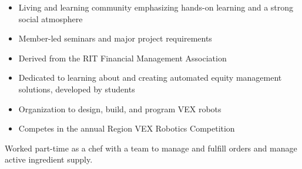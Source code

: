\documentclass[10pt,a4paper,ragged2e,withhyper]{altacv}
\begin{document}
\begin{paracol}{2}
\medskip


\begin{itemize}
    \item Living and learning community emphasizing hands-on learning and a strong social atmosphere
    \item Member-led seminars and major project requirements
\end{itemize}

\divider

\begin{itemize}
    \item Derived from the RIT Financial Management Association
    \item Dedicated to learning about and creating automated equity management solutions, developed by students
\end{itemize}

\divider

\begin{itemize}
    \item Organization to design, build, and program VEX robots
    \item Competes in the annual Region VEX Robotics Competition
\end{itemize}
\switchcolumn


\par

\divider\smallskip


\medskip


Worked part-time as a chef with a team to manage and fulfill orders and manage active ingredient supply.


\end{paracol}
\end{document}
